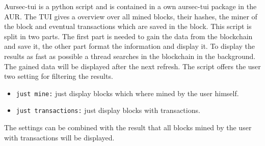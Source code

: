 \label{sec:tui}
Aursec-tui is a python script and is contained in a own aursec-tui package in the AUR. The TUI gives a overview over all mined blocks, their hashes, the miner of the block and eventual transactions which are saved in the block. This script is split in two parts. The first part is needed to gain the data from the blockchain and save it, the other part format the information and display it. To display the results as fast as possible a thread searches in the blockchain in the background. The gained data will be displayed after the next refresh. The script offers the user two setting for filtering the results.
\begin{itemize}
	\item \texttt{just mine:} just display blocks which where mined by the user himself.
	\item \texttt{just transactions:} just display blocks with transactions.
\end{itemize}
The settings can be combined with the result that all blocks mined by the user with transactions will be displayed.